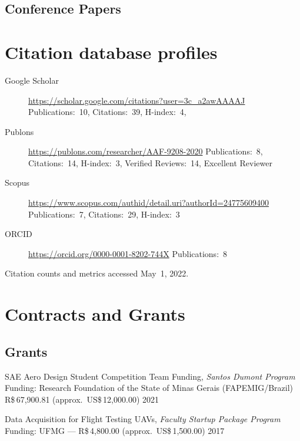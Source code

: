 \documentclass[letterpaper, 11pt, oneside]{memoir}
\begin{document}
\subsection{Conference Papers}
\printbibliography[
  type=inproceedings, heading=none,
]

\section{Citation database profiles}
\begin{description}
\item[Google Scholar] 
  \url{https://scholar.google.com/citations?user=3c_a2awAAAAJ}\newline
  Publications:~10, Citations:~39, H-index:~4,
\item[Publons]
  \url{https://publons.com/researcher/AAF-9208-2020}\newline
  Publications:~8, Citations:~14, H-index:~3, Verified Reviews:~14, 
  Excellent Reviewer
\item[Scopus]
  \url{https://www.scopus.com/authid/detail.uri?authorId=24775609400}\newline
  Publications:~7, Citations:~29, H-index:~3
\item[ORCID]
  \url{https://orcid.org/0000-0001-8202-744X}\newline
  Publications:~8
\end{description}

\noindent
Citation counts and metrics accessed May~1, 2022.

\section{Contracts and Grants}
\subsection{Grants}
\begin{description} 
\item {SAE Aero Design Student Competition Team Funding,}
\emph{Santos Dumont Program}
{ \newline Funding: 
  Research Foundation of the State of Minas Gerais (FAPEMIG/Brazil)
  \newline
  R\$\,67,900.81 (approx.\ US\$\,12,000.00)
}{}{}
 \hfill {2021}

\item {Data Acquisition for Flight Testing UAVs,}
\emph{Faculty Startup Package Program}
{\newline Funding: UFMG --- R\$\,4,800.00 (approx.\ US\$\,1,500.00)}{}{}
\hfill {2017}
\end{description}
\end{document}
